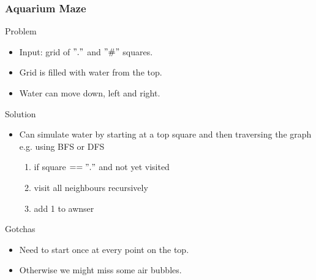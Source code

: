\documentclass{beamer}
\begin{document}
\begin{frame}
    \frametitle{Aquarium Maze}
    \begin{block}{Problem}
        \begin{itemize}
            \item Input: grid of $"."$ and $"\#"$ squares.
            \item Grid is filled with water from the top.
            \item Water can move down, left and right.
        \end{itemize}
    \end{block}
    \begin{block}{Solution}
        \begin{itemize}
            \item Can simulate water by starting at a top square and then traversing the graph e.g. using BFS or DFS
            \begin{enumerate}
                \item if square $== "."$ and not yet visited
                \item visit all neighbours recursively
                \item add 1 to awnser
            \end{enumerate}
        \end{itemize}
    \end{block}
    \begin{block}{Gotchas}
        \begin{itemize}
            \item Need to start once at every point on the top.
            \item Otherwise we might miss some air bubbles.
        \end{itemize}
    \end{block}
\end{frame}
\end{document}
